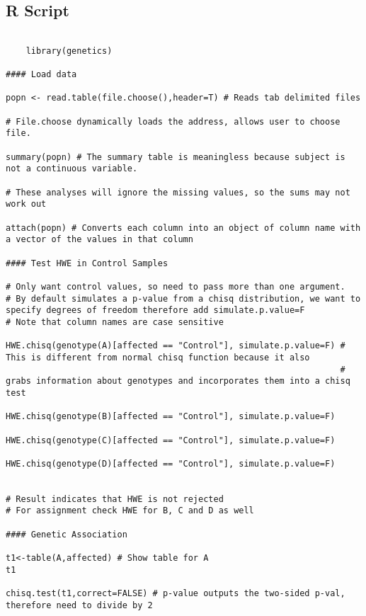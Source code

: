 \documentclass[11 pt,letterpaper]{article}
\begin{document}
\printbibliography

\begin{appendix}

\section{R Script}

\begin{lstlisting}

    library(genetics)

#### Load data

popn <- read.table(file.choose(),header=T) # Reads tab delimited files

# File.choose dynamically loads the address, allows user to choose file.

summary(popn) # The summary table is meaningless because subject is not a continuous variable.

# These analyses will ignore the missing values, so the sums may not work out

attach(popn) # Converts each column into an object of column name with a vector of the values in that column

#### Test HWE in Control Samples

# Only want control values, so need to pass more than one argument.
# By default simulates a p-value from a chisq distribution, we want to specify degrees of freedom therefore add simulate.p.value=F
# Note that column names are case sensitive

HWE.chisq(genotype(A)[affected == "Control"], simulate.p.value=F) # This is different from normal chisq function because it also 
                                                                  # grabs information about genotypes and incorporates them into a chisq test

HWE.chisq(genotype(B)[affected == "Control"], simulate.p.value=F)

HWE.chisq(genotype(C)[affected == "Control"], simulate.p.value=F)

HWE.chisq(genotype(D)[affected == "Control"], simulate.p.value=F)


# Result indicates that HWE is not rejected
# For assignment check HWE for B, C and D as well

#### Genetic Association

t1<-table(A,affected) # Show table for A
t1

chisq.test(t1,correct=FALSE) # p-value outputs the two-sided p-val, therefore need to divide by 2


\end{lstlisting}
\end{appendix}
\end{document}
